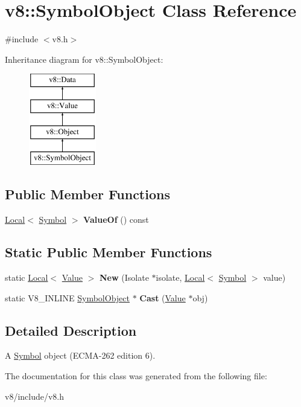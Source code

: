 \hypertarget{classv8_1_1SymbolObject}{}\section{v8\+:\+:Symbol\+Object Class Reference}
\label{classv8_1_1SymbolObject}


{\ttfamily \#include $<$v8.\+h$>$}

Inheritance diagram for v8\+:\+:Symbol\+Object\+:\begin{figure}[H]
\begin{center}
\leavevmode
\includegraphics[height=4.000000cm]{classv8_1_1SymbolObject}
\end{center}
\end{figure}
\subsection*{Public Member Functions}
\begin{DoxyCompactItemize}
\item 
\mbox{\label{classv8_1_1SymbolObject_a07e6a12e98b3787165addcafd9273aa7}} 
\mbox{\hyperlink{classv8_1_1Local}{Local}}$<$ \mbox{\hyperlink{classv8_1_1Symbol}{Symbol}} $>$ {\bfseries Value\+Of} () const
\end{DoxyCompactItemize}
\subsection*{Static Public Member Functions}
\begin{DoxyCompactItemize}
\item 
\mbox{\label{classv8_1_1SymbolObject_a3a3dc109d1207e4fe20671c17f5426c0}} 
static \mbox{\hyperlink{classv8_1_1Local}{Local}}$<$ \mbox{\hyperlink{classv8_1_1Value}{Value}} $>$ {\bfseries New} (Isolate $\ast$isolate, \mbox{\hyperlink{classv8_1_1Local}{Local}}$<$ \mbox{\hyperlink{classv8_1_1Symbol}{Symbol}} $>$ value)
\item 
\mbox{\label{classv8_1_1SymbolObject_a03322931e62adfd4e5d184d15d5e4af9}} 
static V8\+\_\+\+I\+N\+L\+I\+NE \mbox{\hyperlink{classv8_1_1SymbolObject}{Symbol\+Object}} $\ast$ {\bfseries Cast} (\mbox{\hyperlink{classv8_1_1Value}{Value}} $\ast$obj)
\end{DoxyCompactItemize}


\subsection{Detailed Description}
A \mbox{\hyperlink{classv8_1_1Symbol}{Symbol}} object (E\+C\+M\+A-\/262 edition 6). 

The documentation for this class was generated from the following file\+:\begin{DoxyCompactItemize}
\item 
v8/include/v8.\+h\end{DoxyCompactItemize}
